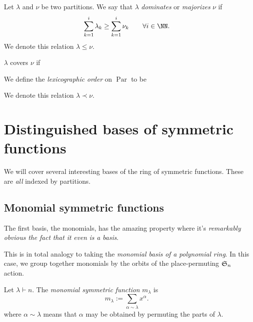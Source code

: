 \documentclass{article}
\DeclareMathOperator{\Par}{Par}
\newcommand{\frkS}{\ensuremath\mathfrak{S}}
\begin{document}
\begin{definition}
    Let $\lambda$ and $\nu$ be two partitions. We say that $\lambda$ \textit{dominates} or \textit{majorizes} $\nu$ if
    \[
        \sum_{k=1}^i \lambda_k \geq \sum_{k=1}^i \nu_k \qquad \forall i\in\NN.
    \]
    We denote this relation $\lambda \leq \nu$.
\end{definition}

\begin{theorem}
    $\lambda$ covers $\nu$ if
\end{theorem}

\begin{definition}
    We define the \textit{lexicographic order} on $\Par$ to be

    We denote this relation $\lambda \prec \nu$.
\end{definition}

\begin{theorem}
\end{theorem}

\begin{theorem}
\end{theorem}

\section{Distinguished bases of symmetric functions}

We will cover several interesting bases of the ring of symmetric functions. These are \textit{all} indexed by partitions.

\subsection{Monomial symmetric functions}

The first basis, the monomials, has the amazing property where it's \textit{remarkably obvious the fact that it even is a basis}.

This is in total analogy to taking the \textit{monomial basis of a polynomial ring}. In this case, we group together monomials by the orbits of the place-permuting $\frkS_n$ action.

\begin{definition}
    Let $\lambda \vdash n$. The \textit{monomial symmetric function} $m_\lambda$ is 
    \[
        m_\lambda := \sum_{\alpha \sim \lambda} x^\alpha.
    \]
    where $\alpha \sim \lambda$ means that $\alpha$ may be obtained by permuting the parts of $\lambda$.
\end{definition}
\end{document}
